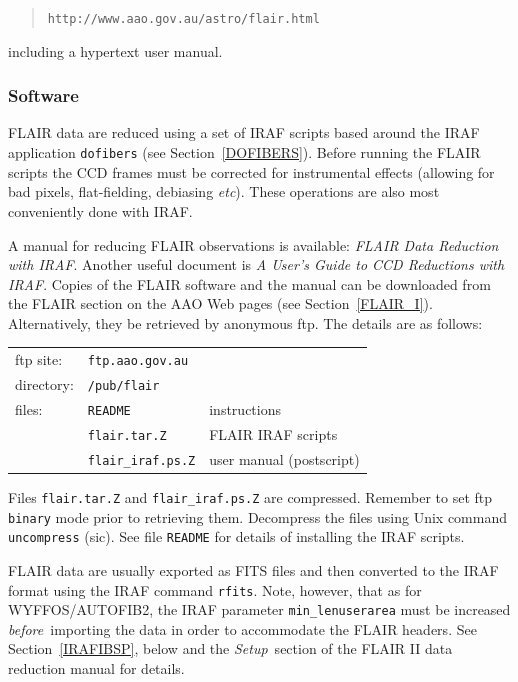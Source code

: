 \documentclass[twoside,11pt]{article}
\newcommand{\htmladdnormallink}[2]{#1}
\begin{document}
\begin{quote}
\htmladdnormallink{ {\tt http://www.aao.gov.au/astro/flair.html} }
{http://www.aao.gov.au/astro/flair.html}
\end{quote}

including a hypertext user manual.

\subsubsection{\label{FLAIR_S}Software}

FLAIR data are reduced using a set of IRAF scripts based
around the IRAF application {\tt dofibers} (see Section~\ref{DOFIBERS}).
Before running the FLAIR scripts the CCD frames must be corrected for
instrumental effects (allowing for bad pixels, flat-fielding, debiasing
\emph{etc}).  These operations are also most conveniently done with IRAF.

A manual for reducing FLAIR observations is available: {\it FLAIR Data
Reduction with IRAF}\/\cite{DRINK96}.  Another useful document is {\it A
User's Guide to CCD Reductions with IRAF}\/\cite{MASSEY92}.  Copies of the
FLAIR software and the manual can be downloaded from the FLAIR section on
the AAO Web pages (see Section~\ref{FLAIR_I}).  Alternatively, they be
retrieved by anonymous ftp.  The details are as follows:

\begin{tabular}{lll}
ftp site:  & {\tt ftp.aao.gov.au}   & \\
directory: & {\tt /pub/flair}       & \\
files:     & {\tt README}           & instructions             \\
           & {\tt flair.tar.Z}      & FLAIR IRAF scripts       \\
           & {\tt flair\_iraf.ps.Z} & user manual (postscript) \\
\end{tabular}

Files {\tt flair.tar.Z} and {\tt flair\_iraf.ps.Z} are compressed.
Remember to set ftp {\tt binary} mode prior to retrieving them.
Decompress the files using Unix command {\tt uncompress} (sic).  See
file {\tt README} for details of installing the IRAF scripts.

FLAIR data are usually exported as FITS files and then converted to
the IRAF format using the IRAF command {\tt rfits}.  Note, however,
that as for WYFFOS/AUTOFIB2, the IRAF parameter {\tt min\_lenuserarea}
must be increased {\it before}\, importing the data in order to
accommodate the FLAIR headers.  See Section~\ref{IRAFIBSP}, below and the
{\it Setup}\, section of the FLAIR II data reduction manual for details.
\end{document}

